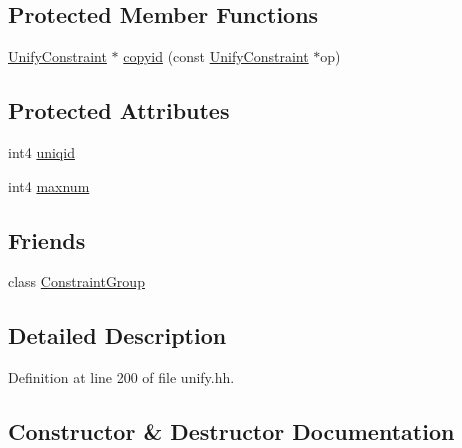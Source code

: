 \subsection*{Protected Member Functions}
\begin{DoxyCompactItemize}
\item 
\mbox{\hyperlink{class_unify_constraint}{Unify\+Constraint}} $\ast$ \mbox{\hyperlink{class_unify_constraint_ad437d193c74ae8e03077da359df718c2}{copyid}} (const \mbox{\hyperlink{class_unify_constraint}{Unify\+Constraint}} $\ast$op)
\end{DoxyCompactItemize}
\subsection*{Protected Attributes}
\begin{DoxyCompactItemize}
\item 
int4 \mbox{\hyperlink{class_unify_constraint_a0cda7b149850ec9d85684f1d626751c0}{uniqid}}
\item 
int4 \mbox{\hyperlink{class_unify_constraint_a9123065d84784017ba4e08a1bcc03450}{maxnum}}
\end{DoxyCompactItemize}
\subsection*{Friends}
\begin{DoxyCompactItemize}
\item 
class \mbox{\hyperlink{class_unify_constraint_a2131c775acfc52d54dfc7a22b4f538db}{Constraint\+Group}}
\end{DoxyCompactItemize}


\subsection{Detailed Description}


Definition at line 200 of file unify.\+hh.



\subsection{Constructor \& Destructor Documentation}
\mbox{\label{class_unify_constraint_a733f8ac84d286fed6cc06a0484db7296}} 
